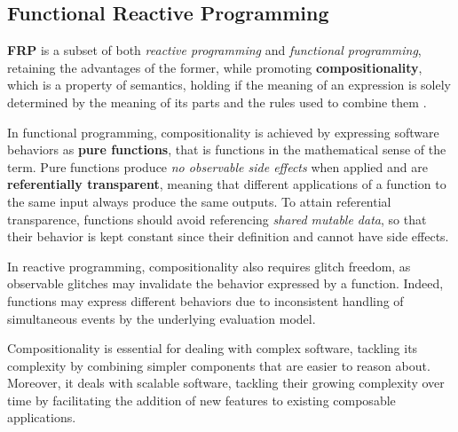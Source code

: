 
\subsection{Functional Reactive Programming}
\label{section:background:concepts:frp}

\textbf{\ac{FRP}} is a subset of both \textit{reactive programming} and
\textit{functional programming}, retaining the advantages of the former,
while promoting \textbf{compositionality}, which is a property of semantics,
holding if the meaning of an expression is solely determined by the meaning of
its parts and the rules used to combine them \cite{FRP}.

In functional programming, compositionality is achieved by expressing software
behaviors as \textbf{pure functions}, that is functions in the mathematical
sense of the term. Pure functions produce \textit{no observable side effects}
when applied and are \textbf{referentially transparent}, meaning that different
applications of a function to the same input always produce the same outputs.
To attain referential transparence, functions should avoid referencing
\textit{shared mutable data}, so that their behavior is kept constant since
their definition and cannot have side effects.

In reactive programming, compositionality also requires glitch freedom, as
observable glitches may invalidate the behavior expressed by a function.
Indeed, functions may express different behaviors due to inconsistent handling
of simultaneous events by the underlying evaluation model.

Compositionality is essential for dealing with complex software, tackling its
complexity by combining simpler components that are easier to reason about.
Moreover, it deals with scalable software, tackling their growing complexity
over time by facilitating the addition of new features to existing composable
applications.
